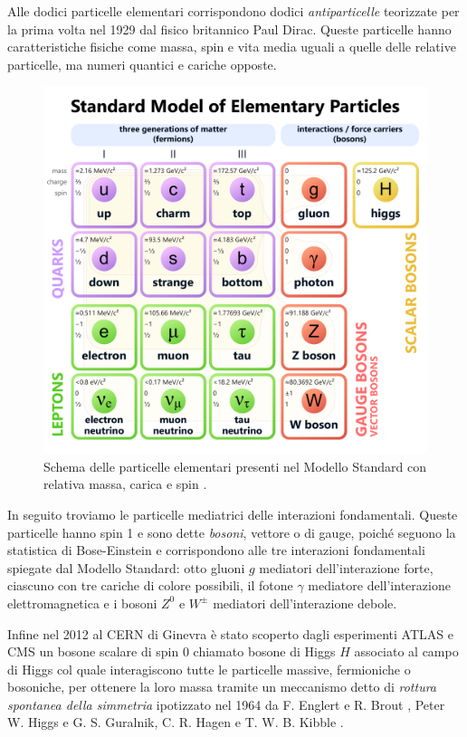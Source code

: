     Alle dodici particelle elementari corrispondono dodici \textit{antiparticelle} teorizzate per la prima volta nel 1929 dal fisico britannico Paul Dirac. Queste particelle hanno caratteristiche fisiche come massa, spin e vita media uguali a quelle delle relative particelle, ma numeri quantici e cariche opposte.

    \begin{figure}[t]
        \centering
        \includegraphics[width=0.8\linewidth]{res/fig/1-chapter/1-Standard_Model_of_Elementary_Particles}
        \caption{Schema delle particelle elementari presenti nel Modello Standard con relativa massa, carica e spin \cite{Wikimedia_Standard_Model}.}
        \label{fig:1-standard-model}
    \end{figure}

    In seguito troviamo le particelle mediatrici delle interazioni fondamentali. Queste particelle hanno spin 1 e sono dette \textit{bosoni}, vettore o di gauge, poiché seguono la statistica di Bose-Einstein e corrispondono alle tre interazioni fondamentali spiegate dal Modello Standard: otto gluoni $g$ mediatori dell'interazione forte, ciascuno con tre cariche di colore possibili, il fotone $\gamma$ mediatore dell'interazione elettromagnetica e i bosoni $Z^0$ e $W^\pm$ mediatori dell'interazione debole.

    Infine nel 2012 al CERN di Ginevra è stato scoperto dagli esperimenti ATLAS \cite{ATLAS_2012} e CMS \cite{CMS_2012} un bosone scalare di spin 0 chiamato bosone di Higgs $H$ associato al campo di Higgs col quale interagiscono tutte le particelle massive, fermioniche o bosoniche, per ottenere la loro massa tramite un meccanismo detto di \textit{rottura spontanea della simmetria} ipotizzato nel 1964 da F. Englert e R. Brout \cite{Englert_1964}, Peter W. Higgs \cite{Higgs_1964} e G. S. Guralnik, C. R. Hagen e T. W. B. Kibble \cite{GHK_1964}.
    
